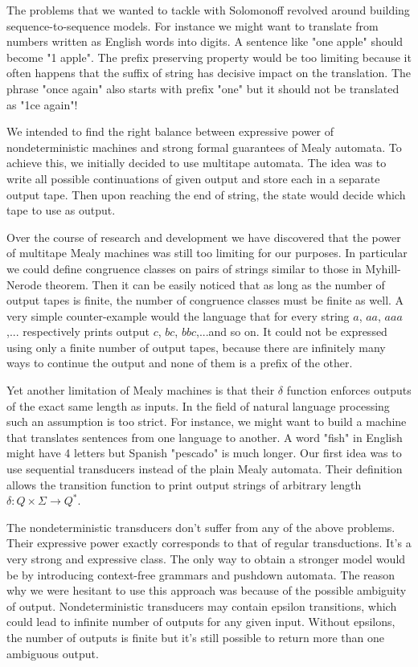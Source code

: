 \documentclass[12pt]{article}
\begin{document}
The problems that we wanted to tackle with Solomonoff revolved around building sequence-to-sequence models. For instance we might want to translate from numbers written as English words into digits. A sentence like "one apple" should become "1 apple". The prefix preserving property would be too limiting because it often happens that the suffix of string has decisive impact on the translation. The phrase "once again"
also starts with prefix "one" but it should not be translated as "1ce again"!

We intended to find the right balance between expressive power of nondeterministic machines and strong formal guarantees of Mealy automata. To achieve this, we initially decided to use multitape automata. The idea was to write all possible continuations of given output and store each in a separate output tape. Then upon reaching the end of string, the state would decide which tape to use as output. 

Over the course of research and development we have discovered that the power of multitape Mealy machines was still too limiting for our purposes. In particular we could define congruence classes on pairs of strings similar to those in Myhill-Nerode theorem. Then it can be easily noticed that as long as the number of output tapes is finite, the number of congruence classes must be finite as well. A very simple counter-example would the language that for every string $a$, $aa$, $aaa$,... respectively prints output $c$, $bc$, $bbc$,...and so on. It could not be expressed using only a finite number of output tapes, because there are infinitely many ways to continue the output and none of them is a prefix of the other.  



Yet another limitation of Mealy machines is that their $\delta$ function enforces outputs of the exact same length as inputs. In the field of natural language processing such an assumption is too strict. For instance, we might want to 
build a machine that translates sentences from one language to another. A word "fish" in English might have 4 letters but Spanish "pescado" is much longer. Our first idea was to use sequential transducers instead of the plain Mealy automata. Their definition allows the transition function to print output strings of arbitrary length $\delta:Q\times \Sigma \rightarrow Q^*$. 


The nondeterministic transducers  don't suffer from any of the above problems. Their expressive power exactly corresponds to that of regular transductions. It's a very strong and expressive class. The only way to obtain a stronger model would be by introducing context-free grammars and pushdown automata. The reason why we were hesitant to use this approach was because of the possible ambiguity of output. Nondeterministic transducers may contain epsilon transitions, which could lead to infinite number of outputs for any given input. Without epsilons, the number of outputs is finite but it's still possible to return more than one ambiguous output.
\end{document}
